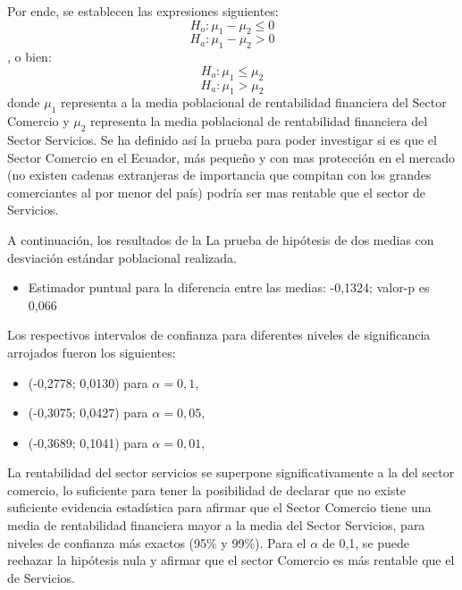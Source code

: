 \documentclass[12pt,a4paper,twoside]{article}
\begin{document}
Por ende, se establecen las expresiones siguientes:
$$H_{o}:\mu_{1}-\mu_{2}\leq 0$$
$$H_{a}:\mu_{1}-\mu_{2}>0$$
, o bien:
$$H_{o}:\mu_{1}\leq \mu_{2}$$
$$H_{a}:\mu_{1}>\mu_{2}$$
donde $\mu_{1}$ representa a la  media poblacional de rentabilidad financiera del Sector Comercio y $\mu_{2}$ representa la media poblacional de rentabilidad financiera del Sector Servicios. Se ha definido así la prueba para poder investigar si es que el Sector Comercio en el Ecuador, más pequeño y con mas protección en el mercado (no existen cadenas extranjeras de importancia que compitan con los grandes comerciantes al por menor del país) podría ser mas rentable que el sector de Servicios.

A continuación, los resultados de la La prueba de hipótesis de dos medias con desviación estándar poblacional realizada.
\begin{figure}[H]
\end{figure}

\begin{itemize}
    \item Estimador puntual para la diferencia entre las medias: -0,1324; valor-p es 0,066
\end{itemize}

Los respectivos intervalos de confianza para diferentes niveles de significancia arrojados fueron los siguientes: 
 
\begin{itemize}
    \item (-0,2778; 0,0130) para $\alpha=0,1$,
    \item (-0,3075; 0,0427) para $\alpha=0,05$, 
    \item (-0,3689; 0,1041) para $\alpha=0,01$,  
\end{itemize}

La rentabilidad del sector servicios se superpone significativamente a la del sector comercio, lo suficiente para  tener la posibilidad de declarar que no existe suficiente evidencia estadística para afirmar que el Sector Comercio tiene una media de rentabilidad financiera mayor a la media del Sector Servicios, para niveles de confianza más exactos (95\% y 99\%). Para el $\alpha$ de 0,1, se puede rechazar la hipótesis nula y afirmar que el sector Comercio es más rentable que el de Servicios. 
\end{document}
